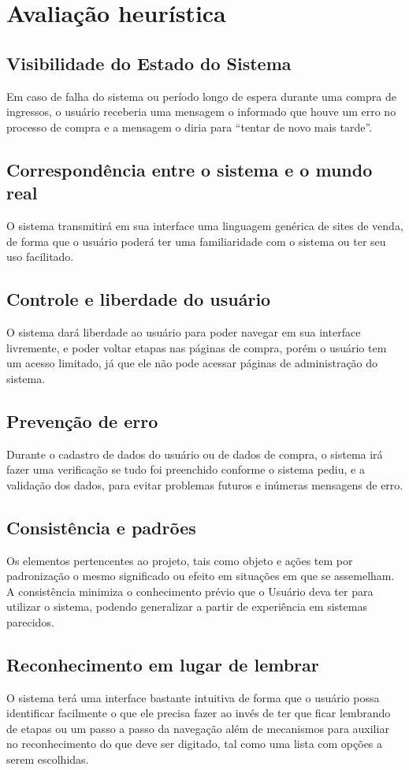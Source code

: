 \documentclass[12pt]{article}
\begin{document}
    \section{Avaliação heurística}
    \subsection{Visibilidade do Estado do Sistema}
Em caso de falha do sistema ou período longo de espera durante uma compra de ingressos, o usuário receberia uma mensagem o informado que houve um erro no processo de compra e a mensagem o diria para “tentar de novo mais tarde”.
\subsection{Correspondência entre o sistema e o mundo real}
O sistema transmitirá em sua interface uma linguagem genérica de sites de venda, de forma que o usuário poderá ter uma familiaridade com o sistema ou ter seu uso facilitado.
\subsection{Controle e liberdade do usuário}
O sistema dará  liberdade ao usuário para poder navegar em sua interface livremente, e poder voltar etapas nas páginas de compra, porém o usuário tem um acesso limitado, já que ele não pode acessar páginas de administração do sistema.
\subsection{Prevenção de erro}
Durante o cadastro de dados do usuário ou de dados de compra, o sistema irá fazer uma verificação se tudo foi preenchido conforme o sistema pediu, e a validação dos dados, para evitar problemas futuros e inúmeras mensagens de erro.
\subsection{Consistência e padrões}
Os elementos pertencentes ao projeto, tais como objeto e ações tem por padronização o mesmo significado ou efeito em situações em que se assemelham. A consistência minimiza o conhecimento prévio que o Usuário deva ter para utilizar o sistema, podendo generalizar a partir de experiência em sistemas parecidos.
\subsection{Reconhecimento em lugar de lembrar}
O sistema terá uma interface bastante intuitiva de forma que o usuário possa identificar facilmente o que ele precisa fazer ao invés de ter que ficar lembrando de etapas ou um passo a passo da navegação além de mecanismos para auxiliar no reconhecimento do que deve ser digitado, tal como uma lista com opções a serem escolhidas.
\end{document}
